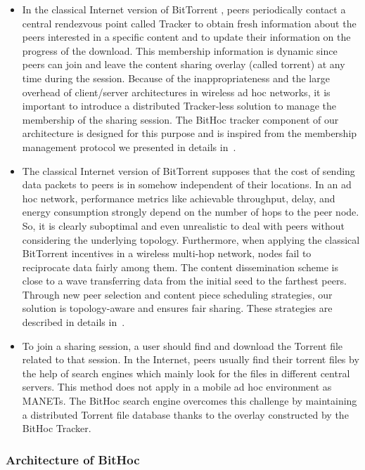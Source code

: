 \begin{itemize}
\item{In the classical Internet version of BitTorrent \cite{RefBT}, peers periodically contact a central rendezvous point called Tracker to obtain fresh information about the peers interested in a specific content and to update their information on the progress of the download. This membership information is dynamic since peers can join and leave the content sharing overlay (called torrent) at any time during the session. Because of the inappropriateness and the large overhead of client/server architectures in wireless ad hoc networks, it is important to introduce a distributed Tracker-less solution to manage the membership of the sharing session. The BitHoc tracker component of our architecture is designed for this purpose and is inspired from the membership management protocol we presented in details in~\cite{BitHoc}.}
\item{The classical Internet version of BitTorrent \cite{RefBT} supposes that the cost of sending data packets to peers is in somehow independent of their locations. In an ad hoc network, performance metrics like achievable throughput, delay, and energy consumption strongly depend on the number of hops to the peer node. So, it is clearly suboptimal and even unrealistic to deal with peers without considering the underlying topology. Furthermore, when applying the classical BitTorrent incentives in a wireless multi-hop network, nodes fail to reciprocate data fairly among them. The content dissemination scheme is close to a wave transferring data from the initial seed to the farthest peers. Through new peer selection and content piece scheduling strategies, our solution is topology-aware and ensures fair sharing. These strategies are described in details in~\cite{BitHoc}.}
\item{To join a sharing session, a user should find and download the Torrent file related to that session. In the Internet, peers usually find their torrent files by the help of search engines which mainly look for the files in different central servers. This method does not apply in a mobile ad hoc environment as MANETs. The BitHoc search engine overcomes this challenge by maintaining a distributed Torrent file database thanks to the overlay constructed by the BitHoc Tracker.}
\end{itemize}

\subsubsection{Architecture of BitHoc}
\label{secarchitecture}

